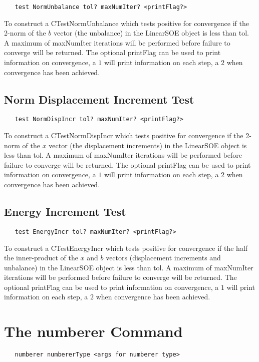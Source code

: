 \documentclass[12pt]{article}
\begin{document}
{\sf\small
\begin{verbatim}
   test NormUnbalance tol? maxNumIter? <printFlag?>
\end{verbatim}
}

\noindent To construct a CTestNormUnbalance which tests positive for
convergence if the 2-norm of the $b$ vector (the unbalance) in the
LinearSOE object is less than tol. A maximum of maxNumIter iterations
will be performed before failure to converge will be returned. The
optional printFlag can be used to print information on convergence, a
$1$ will print information on each step, a $2$ when convergence has
been achieved.

\subsection{Norm Displacement Increment Test}

{\sf\small
\begin{verbatim}
   test NormDispIncr tol? maxNumIter? <printFlag?>
\end{verbatim}
}

\noindent To construct a CTestNormDispIncr which tests positive for
convergence if the 2-norm of the $x$ vector (the displacement increments)
in the LinearSOE object is less than tol. A maximum of maxNumIter iterations
will be performed before failure to converge will be returned. The
optional printFlag can be used to print information on convergence, a
$1$ will print information on each step, a $2$ when convergence has
been achieved.

\subsection{Energy Increment Test}

{\sf\small
\begin{verbatim}
   test EnergyIncr tol? maxNumIter? <printFlag?>
\end{verbatim}
}

\noindent To construct a CTestEnergyIncr which tests positive for
convergence if the half the inner-product of the $x$ and $b$ vectors
(displacement increments and unbalance) in the LinearSOE object is less 
than tol. A maximum of maxNumIter iterations will be performed before failure 
to converge will be returned. The optional printFlag can be used to print
information on convergence, a $1$ will print information on each step,
a $2$ when convergence has been achieved.


\section {The numberer Command}
{\sf\small
\begin{verbatim}
   numberer numbererType <args for numberer type>
\end{verbatim}
}
\end{document}

